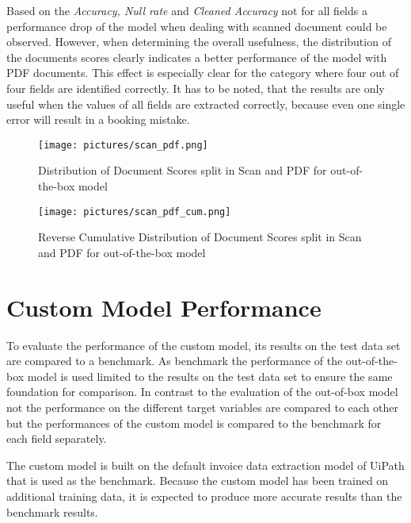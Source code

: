 Based on the \textit{Accuracy, Null rate} and \textit{Cleaned Accuracy} not for all fields a performance drop of the model when dealing with scanned document could be observed. However, when determining the overall usefulness, the distribution of the documents scores clearly indicates a better performance of the model with PDF documents. This effect is especially clear for the category where four out of four fields are identified correctly. It has to be noted, that the results are only useful when the values of all fields are extracted correctly, because even one single error will result in a booking mistake.

\begin{figure}[p]
    \centering 
    \texttt{[image: pictures/scan\_pdf.png]}
    \caption{Distribution of Document Scores split in Scan and PDF for out-of-the-box model}
    \label{pic:scan_pdf_1}    %
\end{figure}
\begin{figure}[p]
    \centering 
    \texttt{[image: pictures/scan\_pdf\_cum.png]}
    \caption{Reverse Cumulative Distribution of Document Scores split in Scan and PDF for out-of-the-box model}
    \label{pic:scan_pdf_1_cum}    %
\end{figure}

\newpage
\section{Custom Model Performance}
To evaluate the performance of the custom model, its results on the test data set are compared to a benchmark. As benchmark the performance of the out-of-the-box model is used limited to the results on the test data set to ensure the same foundation for comparison. In contrast to the evaluation of the out-of-box model not the performance on the different target variables are compared to each other but the performances of the custom model is compared to the benchmark for each field separately.

The custom model is built on the default invoice data extraction model of UiPath that is used as the benchmark. Because the custom model has been trained on additional training data, it is expected to produce more accurate results than the benchmark results.

